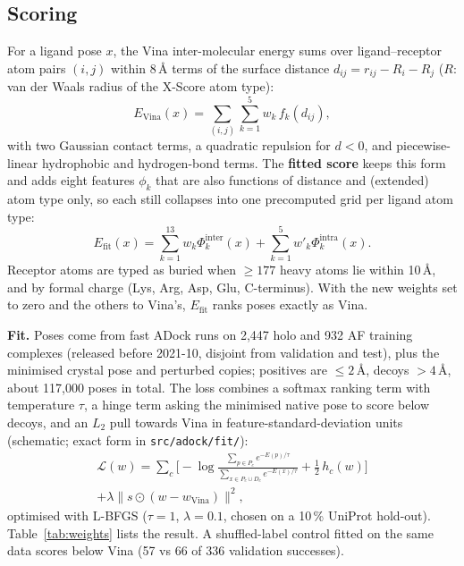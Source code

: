 \documentclass[10pt,a4paper,twocolumn]{article}
\newcommand{\file}[1]{\texttt{\footnotesize #1}}
\begin{document}
\subsection{Scoring}
For a ligand pose $x$, the Vina inter-molecular energy sums over ligand--receptor atom pairs $(i,j)$ within 8\,\AA{}
terms of the surface distance $d_{ij} = r_{ij} - R_i - R_j$ ($R$: van der Waals radius of the X-Score atom type):
\begin{equation}
E_{\text{Vina}}(x) = \sum_{(i,j)} \sum_{k=1}^{5} w_k\, f_k(d_{ij}),
\end{equation}
with two Gaussian contact terms, a quadratic repulsion for $d<0$, and piecewise-linear hydrophobic and hydrogen-bond
terms. The \textbf{fitted score} keeps this form and adds eight features $\phi_k$ that are also functions of distance
and (extended) atom type only, so each still collapses into one precomputed grid per ligand atom type:
\begin{equation}
E_{\text{fit}}(x) = \sum_{k=1}^{13} w_k \Phi^{\text{inter}}_k(x) + \sum_{k=1}^{5} w'_k \Phi^{\text{intra}}_k(x).
\end{equation}
Receptor atoms are typed as buried when $\geq 177$ heavy atoms lie within 10\,\AA, and by formal charge (Lys, Arg, Asp,
Glu, C-terminus). With the new weights set to zero and the others to Vina's, $E_{\text{fit}}$ ranks poses exactly as Vina.

\textbf{Fit.} Poses come from fast ADock runs on 2,447 holo and 932 AF training complexes (released before
2021-10, disjoint from validation and test), plus the minimised crystal pose and perturbed copies; positives are
$\leq 2$\,\AA, decoys $>4$\,\AA, about 117,000 poses in total. The loss combines a softmax ranking term with
temperature $\tau$, a hinge term asking the minimised native pose to score below decoys, and an $L_2$ pull towards
Vina in feature-standard-deviation units (schematic; exact form in \file{src/adock/fit/}):
\begin{multline}
\mathcal{L}(w) = \sum_{c} \Big[ -\log \frac{\sum_{p \in P_c} e^{-E(p)/\tau}}{\sum_{x \in P_c \cup D_c} e^{-E(x)/\tau}}
 + \tfrac12\, h_c(w) \Big] \\ + \lambda \lVert s \odot (w - w_{\text{Vina}}) \rVert^2 ,
\end{multline}
optimised with L-BFGS ($\tau=1$, $\lambda=0.1$, chosen on a 10\,\% UniProt hold-out). Table~\ref{tab:weights} lists
the result. A shuffled-label control fitted on the same data scores below Vina (57 vs 66 of 336 validation successes).
\end{document}
